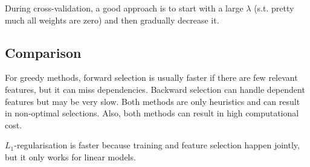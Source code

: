During cross-validation, a good approach is to start with
a large $\lambda$ (s.t. pretty much all weights are zero)
and then gradually decrease it.


\subsection{Comparison}
For greedy methods,
forward selection is usually faster if there are few relevant
features, but it can miss dependencies.
Backward selection can handle dependent features but may be
very slow.
Both methods are only heuristics and can result in non-optimal
selections.
Also, both methods can result in high computational cost.

$L_1$-regularisation is faster because training and feature
selection happen jointly,
but it only works for linear models.

